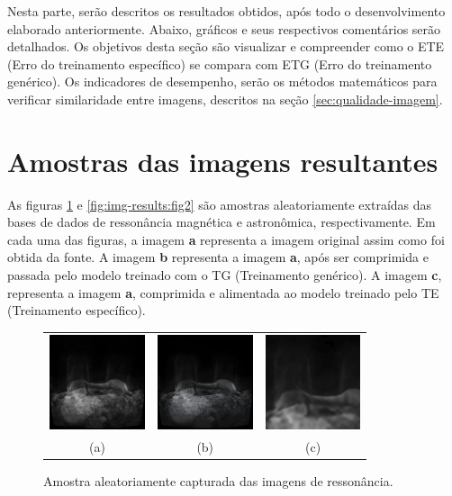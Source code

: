 Nesta parte, serão descritos os resultados obtidos, após todo o desenvolvimento elaborado anteriormente. Abaixo, gráficos e seus respectivos comentários serão detalhados. Os objetivos desta seção são visualizar e compreender como o ETE (Erro do treinamento específico) se compara com ETG (Erro do treinamento genérico). Os indicadores de desempenho, serão os métodos matemáticos para verificar similaridade entre imagens, descritos na seção \ref{sec:qualidade-imagem}. 

\section{Amostras das imagens resultantes}
\label{sec:amostra-img-resultante}

As figuras \ref{fig:img-results:fig1} e \ref{fig:img-results:fig2} são amostras aleatoriamente extraídas das bases de dados de ressonância magnética e astronômica, respectivamente. Em cada uma das figuras, a imagem \textbf{a} representa a imagem original assim como foi obtida da fonte. A imagem \textbf{b} representa a imagem \textbf{a}, após ser comprimida e passada pelo modelo treinado com o TG (Treinamento genérico). A imagem \textbf{c}, representa a imagem \textbf{a}, comprimida e alimentada ao modelo treinado pelo TE (Treinamento específico).

\begin{figure}[H]
    \centering
    \caption{Amostra aleatoriamente capturada das imagens de ressonância.}
    \begin{tabular}{c c c}
        \includegraphics[width=2.8cm]{fig/samples/mri/mri_original.png} & \includegraphics[width=2.8cm]{fig/samples/mri/mri_non_specific_training.png} & \includegraphics[width=2.8cm]{fig/samples/mri/mri_specific_training.png} \\
        (a) & (b) & (c)
    \end{tabular}
    \label{fig:img-results:fig1}
\end{figure}


